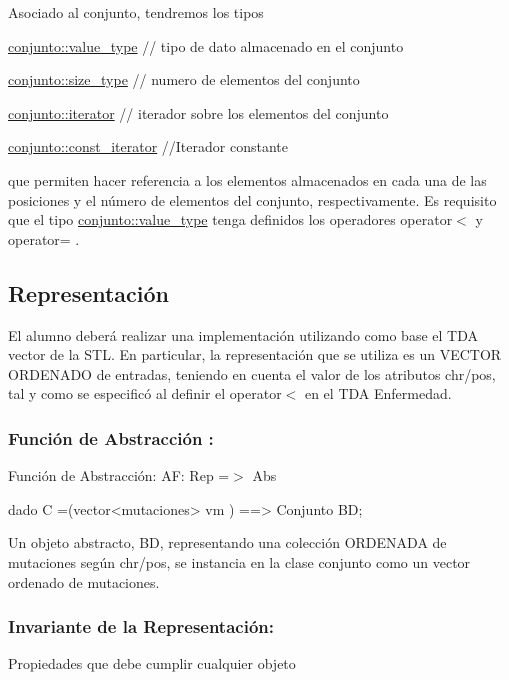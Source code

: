 Asociado al conjunto, tendremos los tipos 
\begin{DoxyCode}
\hyperlink{classconjunto_ad902faf0206fe6aa37e39d8e6e5a880a}{conjunto::value\_type} \textcolor{comment}{// tipo de dato almacenado en el conjunto}

\hyperlink{classconjunto_a855a5893bb0f5a851ab2dbf2b8aa6cc7}{conjunto::size\_type}  \textcolor{comment}{// numero de elementos del conjunto}

\hyperlink{classconjunto_a6de33afebdfa3ec058e9c78f28854311}{conjunto::iterator}  \textcolor{comment}{// iterador sobre los elementos del conjunto}

\hyperlink{classconjunto_aa3cf9f1ee3fc1682b221c33d9f271e2e}{conjunto::const\_iterator} \textcolor{comment}{//Iterador constante}
\end{DoxyCode}
 que permiten hacer referencia a los elementos almacenados en cada una de las posiciones y el número de elementos del conjunto, respectivamente. Es requisito que el tipo \hyperlink{classconjunto_ad902faf0206fe6aa37e39d8e6e5a880a}{conjunto\+::value\+\_\+type} tenga definidos los operadores operator$<$ y operator= .\hypertarget{index_rep}{}\subsection{Representación}\label{index_rep}
El alumno deberá realizar una implementación utilizando como base el T\+DA vector de la S\+TL. En particular, la representación que se utiliza es un V\+E\+C\+T\+OR O\+R\+D\+E\+N\+A\+DO de entradas, teniendo en cuenta el valor de los atributos chr/pos, tal y como se especificó al definir el operator$<$ en el T\+DA Enfermedad.\hypertarget{index_fact_sec2}{}\subsubsection{Función de Abstracción \+:}\label{index_fact_sec2}
Función de Abstracción\+: AF\+: Rep =$>$ Abs \begin{DoxyVerb}dado C =(vector<mutaciones> vm ) ==> Conjunto BD;
\end{DoxyVerb}


Un objeto abstracto, BD, representando una colección O\+R\+D\+E\+N\+A\+DA de mutaciones según chr/pos, se instancia en la clase conjunto como un vector ordenado de mutaciones.\hypertarget{index_inv_sec2}{}\subsubsection{Invariante de la Representación\+:}\label{index_inv_sec2}
Propiedades que debe cumplir cualquier objeto


